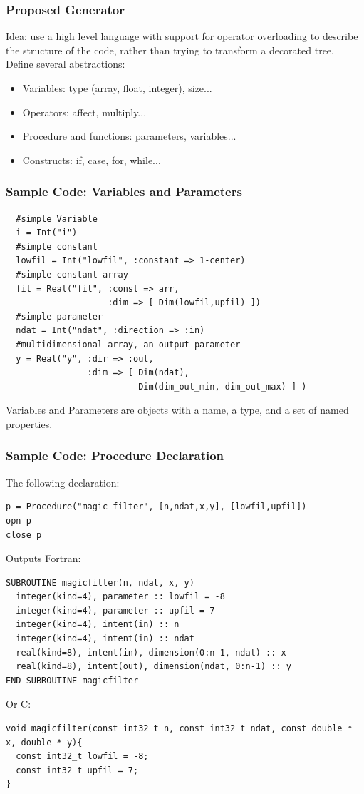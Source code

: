 \documentclass{beamer}
\begin{document}
\begin{frame}
\frametitle{Proposed Generator}
Idea: use a high level language with support for operator overloading to describe the structure of the code, rather than trying to transform a decorated tree.\\
Define several abstractions:
\begin{itemize}
\item Variables: type (array, float, integer), size...
\item Operators: affect, multiply...
\item Procedure and functions: parameters, variables...
\item Constructs: if, case, for, while...
\end{itemize}
\end{frame}

\begin{frame}[fragile]
\frametitle{Sample Code: Variables and Parameters}
\tiny
\lstset{style=BOAST}
\begin{lstlisting}
  #simple Variable
  i = Int("i")
  #simple constant
  lowfil = Int("lowfil", :constant => 1-center)
  #simple constant array
  fil = Real("fil", :const => arr,
                    :dim => [ Dim(lowfil,upfil) ])
  #simple parameter
  ndat = Int("ndat", :direction => :in)
  #multidimensional array, an output parameter
  y = Real("y", :dir => :out, 
                :dim => [ Dim(ndat), 
                          Dim(dim_out_min, dim_out_max) ] )
\end{lstlisting}
\normalsize
Variables and Parameters are objects with a name, a type, and a set of named properties.
\end{frame}

\begin{frame}[fragile]
\frametitle{Sample Code: Procedure Declaration}
The following declaration:
\tiny
\lstset{style=BOAST}
\begin{lstlisting}
p = Procedure("magic_filter", [n,ndat,x,y], [lowfil,upfil])
opn p
close p
\end{lstlisting}
\normalsize 
Outputs Fortran:
\tiny
\lstset{style=Fortran}
\begin{lstlisting}
SUBROUTINE magicfilter(n, ndat, x, y)
  integer(kind=4), parameter :: lowfil = -8
  integer(kind=4), parameter :: upfil = 7
  integer(kind=4), intent(in) :: n
  integer(kind=4), intent(in) :: ndat
  real(kind=8), intent(in), dimension(0:n-1, ndat) :: x
  real(kind=8), intent(out), dimension(ndat, 0:n-1) :: y
END SUBROUTINE magicfilter
\end{lstlisting}
\normalsize
Or C:
\tiny
\lstset{style=C}
\begin{lstlisting}
void magicfilter(const int32_t n, const int32_t ndat, const double * x, double * y){
  const int32_t lowfil = -8;
  const int32_t upfil = 7;
}
\end{lstlisting}
\end{frame}
\end{document}
